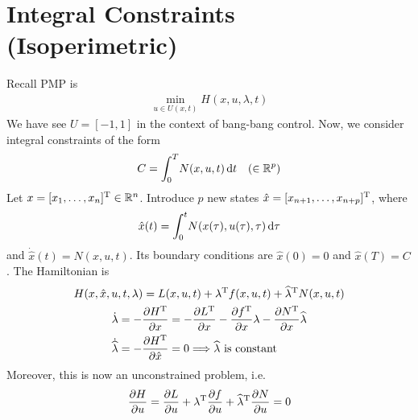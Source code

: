 \section{Integral Constraints (Isoperimetric)}
Recall PMP is
\begin{gather}
  \min_{u\in U(x,t)} H(x,u,\lambda,t)
\end{gather}
We have see $U=[-1,1]$ in the context of bang-bang control. Now, we consider integral constraints of the form
\begin{gather}
  C = \int_0^T \! N(x,u,t)\mathop{}\!\mathrm{d} t \quad (\in \mathbb{R}^p)
\end{gather}
Let $x=[x_1,\dots,x_n]^\text{T} \in\mathbb{R}^n$. Introduce $p$ new states $\hat x=[x_{n+1},\dots,x_{n+p}]^\text{T}$, where
\begin{gather}
  \hat x(t) = \int_0^t\! N(x(\tau),u(\tau),\tau)\mathop{}\!\mathrm{d}\tau
\end{gather}
and $\dot{\hat x}(t)=N(x,u,t)$. Its boundary conditions are $\hat x(0)=0$ and $\hat x(T)=C$. The Hamiltonian is
\begin{gather}
  H(x,\hat{x},u,t,\lambda) = L(x,u,t) + \lambda^\text{T} f(x,u,t) + \widehat{\lambda}^\text{T} N(x,u,t) \\
  \begin{aligned}
    \dot\lambda &= -\frac{\partial H^\text{T}}{\partial x} = -\frac{\partial L^\text{T}}{\partial x} - \frac{\partial f^\text{T}}{\partial x}\lambda - \frac{\partial N^\text{T}}{\partial x}\widehat\lambda \\
    \dot{\widehat\lambda} &= -\frac{\partial H^\text{T}}{\partial \hat x} = 0 \Longrightarrow \widehat\lambda \text{ is constant}
  \end{aligned}
\end{gather}
Moreover, this is now an unconstrained problem, i.e.
\begin{gather}
  \frac{\partial H}{\partial u} = \frac{\partial L}{\partial u} + \lambda^\text{T}\frac{\partial f}{\partial u} + \widehat{\lambda}^\text{T} \frac{\partial N}{\partial u} = 0
\end{gather}

